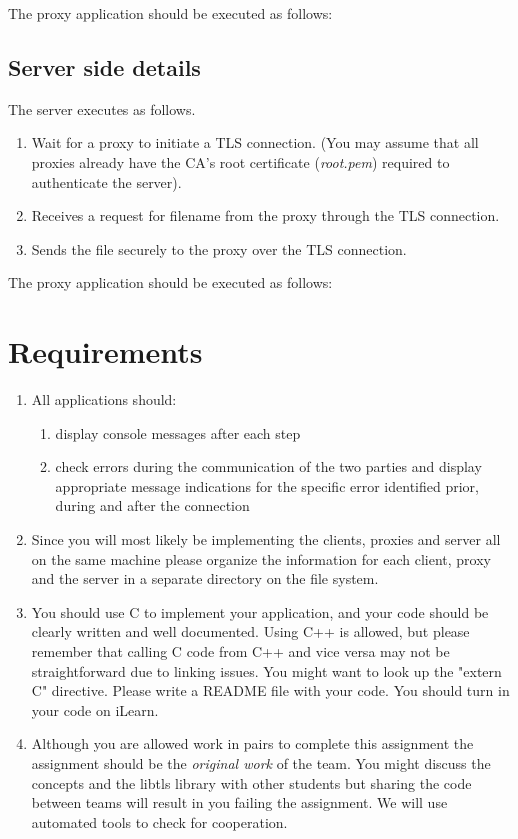 \documentclass[11pt]{article}
\begin{document}
The proxy application should be executed as follows:


\subsection{Server side details}
The server executes as follows.
\begin{enumerate}
\topsep=0pt\itemsep=0pt
\item
Wait for a proxy to initiate a TLS connection.
(You may assume that all proxies already have the CA's root certificate (\textit{root.pem}) required to authenticate the server).
\item
Receives a request for filename from the proxy through the TLS connection.
\item
Sends the file securely to the proxy over the TLS connection.
\end{enumerate}

The proxy application should be executed as follows:



\section{Requirements}
\begin{enumerate}
\topsep=0pt\itemsep=0pt
\item All applications should:
\begin{enumerate}
\topsep=0pt\itemsep=0pt
        \item display console messages after each step
        \item check errors during the communication of the two parties and 
          display appropriate message indications for the specific error 
          identified prior, during and after the connection
\end{enumerate}
\item Since you will most likely be implementing the clients, proxies and server
all on the same machine please organize the information for each client, proxy
and the server in a separate directory on the file system.
\item You should use C to implement your application, and your code 
should be clearly written and well documented. Using C++ is allowed, but please remember that calling C code from C++ and vice versa may not be straightforward due to linking issues. You might want to look up the "extern C" directive. Please write a README file with your code. You should turn in your code on iLearn.
\item Although you are allowed work in pairs to complete this 
assignment the assignment should be the {\it original work\/} of the team. 
You might discuss the concepts and the libtls library with other students but 
sharing the code between teams will result in you failing the assignment. 
We will use automated tools to check for cooperation. 
\end{enumerate}
\end{document}
